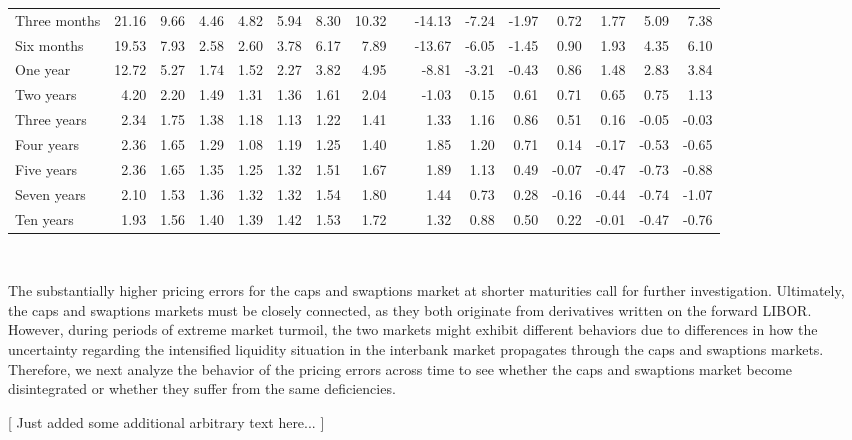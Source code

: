 \documentclass[11pt,a4paper,english,oneside]{book}
\numberwithin{equation}{chapter}
\begin{document}
\begin{table}
\begin{tabular}{lrrrrrrrlrrrrrrr}
\midrule
Three months	&	21.16  & 9.66  &  4.46 & 4.82  & 5.94&8.30  & 10.32 && -14.13  & -7.24&  -1.97&  0.72 &   1.77&  5.09&   7.38\\
Six months	&	19.53  & 7.93  &  2.58 & 2.60  & 3.78&6.17  &  7.89 && -13.67  & -6.05&  -1.45&  0.90 &   1.93&  4.35&   6.10\\
One year	&	12.72  & 5.27  &  1.74 & 1.52  & 2.27&3.82  &  4.95 && -8.81   &-3.21 & -0.43 &  0.86 &  1.48 & 2.83 &  3.84\\
Two years	&	 4.20  & 2.20  &  1.49 & 1.31  & 1.36&1.61  &  2.04 && -1.03   & 0.15 &  0.61 &  0.71 &  0.65 & 0.75 &  1.13\\
Three years	&	 2.34  & 1.75  &  1.38 & 1.18  & 1.13&1.22  &  1.41 &&  1.33   & 1.16 &  0.86 &  0.51 &  0.16 &-0.05 & -0.03\\
Four years	&	 2.36  & 1.65  &  1.29 & 1.08  & 1.19&1.25  &  1.40 &&  1.85   & 1.20 &  0.71 &  0.14 & -0.17 &-0.53 & -0.65\\
Five years	&	 2.36  & 1.65  &  1.35 & 1.25  & 1.32&1.51  &  1.67 &&  1.89   & 1.13 &  0.49 & -0.07 & -0.47 &-0.73 & -0.88\\
Seven years	&	 2.10  & 1.53  &  1.36 & 1.32  & 1.32&1.54  &  1.80	&&  1.44   & 0.73 &  0.28 & -0.16 & -0.44 &-0.74 & -1.07\\
Ten years   &  1.93   & 1.56  &  1.40 & 1.39  & 1.42&1.53  &  1.72 &&  1.32   &0.88  &  0.50 &  0.22 & -0.01 & -0.47& -0.76\\ \bottomrule
\end{tabular}\\
\end{table}



The substantially higher pricing errors for the caps and swaptions market at shorter maturities call for further investigation.
Ultimately, the caps and swaptions markets must be closely connected, as they both originate from derivatives written on the forward LIBOR. However, during periods of extreme market turmoil, the two markets might exhibit different behaviors due to differences in how the uncertainty regarding the intensified liquidity situation in the interbank market propagates through the caps and swaptions markets. Therefore, we next analyze the behavior of the pricing errors across time to see whether the caps and swaptions market become disintegrated or whether they suffer from the same deficiencies.

[ Just added some additional arbitrary text here... ]
\lipsum
\end{document}
